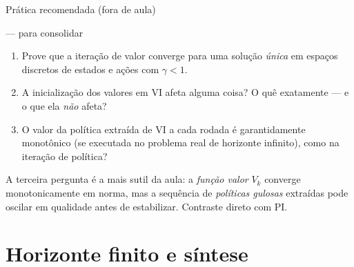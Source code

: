 \documentclass[aspectratio=169, 11pt]{beamer}
\begin{document}
\begin{frame}{Prática recomendada (fora de aula)}
  \begin{exbox}{--- para consolidar}
    \begin{enumerate}\setlength{\itemsep}{0.5ex}
      \item Prove que a iteração de valor converge para uma solução \emph{única} em
            espaços discretos de estados e ações com $\gamma < 1$.
      \item A inicialização dos valores em VI afeta alguma coisa? O quê exatamente ---
            e o que ela \emph{não} afeta?
      \item O valor da política extraída de VI a cada rodada é garantidamente
            \alert{monotônico} (se executada no problema real de horizonte infinito),
            como na iteração de política?
    \end{enumerate}
  \end{exbox}
  \begin{ideiabox}
    A terceira pergunta é a mais sutil da aula: a \emph{função valor} $V_k$ converge
    monotonicamente em norma, mas a sequência de \emph{políticas gulosas} extraídas pode
    oscilar em qualidade antes de estabilizar. Contraste direto com PI.
  \end{ideiabox}
\end{frame}

\section{Horizonte finito e síntese}
\end{document}
